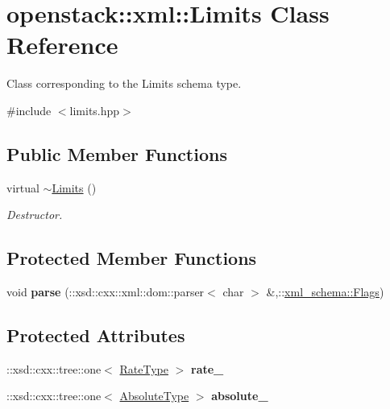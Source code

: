 \hypertarget{classopenstack_1_1xml_1_1Limits}{
\section{openstack::xml::Limits Class Reference}
\label{classopenstack_1_1xml_1_1Limits}
}


Class corresponding to the Limits schema type.  




{\ttfamily \#include $<$limits.hpp$>$}

\subsection*{Public Member Functions}
\begin{DoxyCompactItemize}
\item 
\hypertarget{classopenstack_1_1xml_1_1Limits_a363033eb7b3fb952922ee58dca7a0c8d}{
virtual \hyperlink{classopenstack_1_1xml_1_1Limits_a363033eb7b3fb952922ee58dca7a0c8d}{$\sim$Limits} ()}
\label{classopenstack_1_1xml_1_1Limits_a363033eb7b3fb952922ee58dca7a0c8d}

\begin{DoxyCompactList}\small\item\em Destructor. \item\end{DoxyCompactList}\end{DoxyCompactItemize}
\subsection*{Protected Member Functions}
\begin{DoxyCompactItemize}
\item 
\hypertarget{classopenstack_1_1xml_1_1Limits_a4e16b4c99499598d059902f228990ef5}{
void {\bfseries parse} (::xsd::cxx::xml::dom::parser$<$ char $>$ \&,::\hyperlink{namespacexml__schema_affb4c227cbd9aa7453dd1dc5a1401943}{xml\_\-schema::Flags})}
\label{classopenstack_1_1xml_1_1Limits_a4e16b4c99499598d059902f228990ef5}

\end{DoxyCompactItemize}
\subsection*{Protected Attributes}
\begin{DoxyCompactItemize}
\item 
\hypertarget{classopenstack_1_1xml_1_1Limits_a2fa6ae7ee84bd7007ef57c7b5659d132}{
::xsd::cxx::tree::one$<$ \hyperlink{classopenstack_1_1xml_1_1RateLimits}{RateType} $>$ {\bfseries rate\_\-}}
\label{classopenstack_1_1xml_1_1Limits_a2fa6ae7ee84bd7007ef57c7b5659d132}

\item 
\hypertarget{classopenstack_1_1xml_1_1Limits_a1b12961949c7edbfaa032bc32939ff89}{
::xsd::cxx::tree::one$<$ \hyperlink{classopenstack_1_1xml_1_1AbsoluteLimits}{AbsoluteType} $>$ {\bfseries absolute\_\-}}
\label{classopenstack_1_1xml_1_1Limits_a1b12961949c7edbfaa032bc32939ff89}

\end{DoxyCompactItemize}
